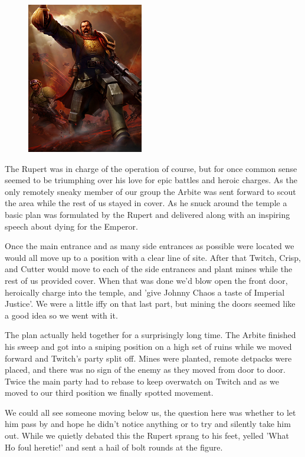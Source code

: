\begin{figure}
	\begin{center}
		\includegraphics[width=\figwidth]{pics/6/38.png}
	\end{center}
\end{figure}
The Rupert was in charge of the operation of course, but for once common sense seemed to be triumphing over his love for epic battles and heroic charges. 
As the only remotely sneaky member of our group the Arbite was sent forward to scout the area while the rest of us stayed in cover. 
As he snuck around the temple a basic plan was formulated by the Rupert and delivered along with an inspiring speech about dying for the Emperor. 

Once the main entrance and as many side entrances as possible were located we would all move up to a position with a clear line of site. 
After that Twitch, Crisp, and Cutter would move to each of the side entrances and plant mines while the rest of us provided cover. 
When that was done we'd blow open the front door, heroically charge into the temple, and 'give Johnny Chaos a taste of Imperial Justice'. 
We were a little iffy on that last part, but mining the doors seemed like a good idea so we went with it.

The plan actually held together for a surprisingly long time. 
The Arbite finished his sweep and got into a sniping position on a high set of ruins while we moved forward and Twitch's party split off. 
Mines were planted, remote detpacks were placed, and there was no sign of the enemy as they moved from door to door. 
Twice the main party had to rebase to keep overwatch on Twitch and as we moved to our third position we finally spotted movement.

We could all see someone moving below us, the question here was whether to let him pass by and hope he didn't notice anything or to try and silently take him out. 
While we quietly debated this the Rupert sprang to his feet, yelled 'What Ho foul heretic!' and sent a hail of bolt rounds at the figure.

